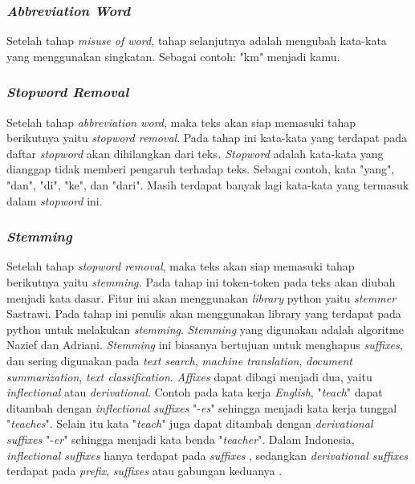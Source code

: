 \subsubsection{\textit{Abbreviation Word}}
Setelah tahap \textit{misuse of word, }tahap selanjutnya adalah 
mengubah kata-kata yang menggunakan singkatan. Sebagai contoh: "km" 
menjadi kamu.
\subsubsection{\textit{Stopword Removal}}
Setelah tahap \textit{abbreviation word}, maka teks akan siap 
memasuki tahap berikutnya yaitu \textit{stopword removal}. Pada tahap 
ini kata-kata yang terdapat pada daftar \textit{stopword }akan 
dihilangkan dari teks\textit{. Stopword }adalah kata-kata yang 
dianggap tidak memberi pengaruh terhadap teks. Sebagai contoh, kata 
"yang", "dan", "di", "ke", dan "dari". Masih terdapat banyak 
lagi kata-kata yang termasuk dalam \textit{stopword }ini.
\subsubsection{\textit{Stemming}}
Setelah tahap \textit{stopword removal}, maka teks akan siap memasuki 
tahap berikutnya yaitu \textit{stemming. }Pada tahap ini token-token 
pada teks akan diubah menjadi kata dasar. Fitur ini akan menggunakan 
\textit{library} python yaitu \textit{stemmer }Sastrawi. Pada tahap 
ini penulis akan menggunakan library yang terdapat pada python untuk 
melakukan \textit{stemming}. \textit{Stemming} yang digunakan 
adalah algoritme Nazief dan Adriani. \textit{Stemming }ini biasanya 
bertujuan untuk menghapus \textit{suffixes}, dan sering digunakan 
pada \textit{text search},\textit{ machine translation},\textit{ 
	document summarization},\textit{ text classification}. \textit{
	Affixes }dapat dibagi menjadi dua, yaitu \textit{inflectional }atau 
\textit{derivational}. Contoh pada kata kerja \textit{English}, 
"\textit{teach}" dapat ditambah dengan \textit{inflectional 
	suffixes }"-\textit{es}" sehingga menjadi kata kerja tunggal "\textit{teaches}". Selain itu kata "\textit{teach}" juga dapat 
ditambah dengan \textit{derivational suffixes }"-\textit{er}" 
sehingga menjadi kata benda "\textit{teacher}". Dalam Indonesia, 
\textit{inflectional suffixes }hanya terdapat pada \textit{suffixes}
, sedangkan \textit{derivational suffixes} terdapat pada \textit{
	prefix}, \textit{suffixes} atau gabungan keduanya \cite{12}.

